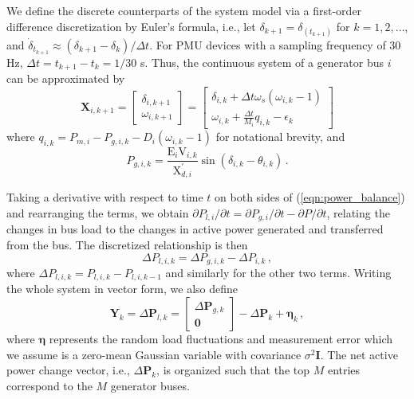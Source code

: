 We define the discrete counterparts of the system model via a first-order difference discretization by Euler's formula, i.e., let $\delta_{k+1} = \delta_(t_{k+1})$ for $k = 1, 2, \dots$, and $\dot{\delta}_{t_{k+1}} \approx (\delta_{k+1}-\delta_{k})/\Delta t$. For PMU devices with a sampling frequency of 30 Hz, $\Delta t = t_{k+1} - t_{k} = 1/30$ s. Thus, the continuous system of a generator bus $i$ can be approximated by
\begin{equation}
\label{eqn:de_discrete}
\boldsymbol{X}_{i,k+1} = 
\left[
\begin{array}{c}
\delta_{i,k+1} \\
\omega_{i,k+1}
\end{array}
\right] =
\left[
\begin{array}{c}
\delta_{i,k} + \Delta t \omega_s\left(\omega_{i,k}-1\right) \\
\omega_{i,k} + \frac{\Delta t}{M_i}q_{i, k} - \epsilon_{k}\,
\end{array}
\right]  
\end{equation}
where $q_{i, k} = {P}_{m, i}-{P}_{g, i,k}-D_i\left(\omega_{i,k}-1\right)$ for notational brevity, and 
\begin{equation}
\label{eqn:p_g_discrete}
{P}_{g,i,k} = \frac{\text{E}_i\text{V}_{i, k}}{\text{X}_{d, i}^{'}}\sin (\delta_{i, k} - \theta_{i,k}) \,.
\end{equation}

Taking a derivative with respect to time $t$ on both sides
of (\ref{eqn:power_balance}) and rearranging the terms, we obtain $\partial {P}_{l, i}/\partial t = \partial {P}_{g, i}/\partial t -  \partial {P}/\partial t$, 
relating the changes in bus load to the changes in active power generated and transferred from the bus. The discretized relationship is then
\begin{equation}
\label{eqn:ae_discrete}
\Delta{P}_{l, i, k} = \Delta{P}_{g, i, k} -  \Delta{P}_{i, k}\,,
\end{equation}
where $\Delta{P}_{l, i, k} = {P}_{l, i, k} - {P}_{l, i, k-1}$ and similarly for the other two terms. Writing the whole system in vector form, we also define
\begin{equation}
\label{eqn:ae_discrete}
\boldsymbol{Y}_{k} = \Delta\boldsymbol{P}_{l, k} =
\left[
\begin{array}{c}
\Delta\boldsymbol{P}_{g, k} \\
\boldsymbol{0}\,
\end{array}
\right]  - 
\Delta\boldsymbol{P}_{k} + \boldsymbol{\eta}_k\,,
\end{equation}
where $\boldsymbol{\eta}$ represents the random load fluctuations and measurement error which we assume is a zero-mean Gaussian variable with covariance $\sigma^2\mathbf{I}$. The net active power change vector, i.e., $\Delta\boldsymbol{P}_{k}$, is organized such that the top $M$ entries correspond to the $M$ generator buses. 

